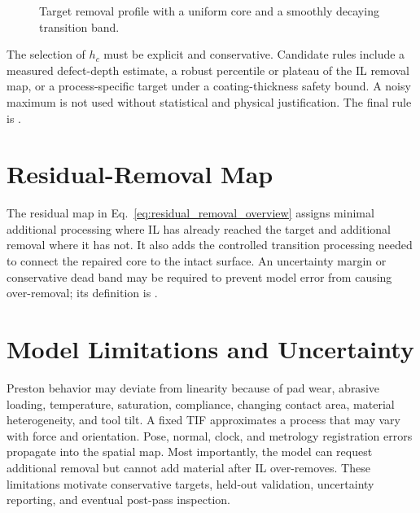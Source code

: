 \begin{figure}[t]
  \centering
  \caption{Target removal profile with a uniform core and a smoothly decaying transition band.}
  \label{fig:target_profile}
\end{figure}

The selection of \(h_c\) must be explicit and conservative. Candidate rules include a measured defect-depth estimate, a robust percentile or plateau of the IL removal map, or a process-specific target under a coating-thickness safety bound. A noisy maximum is not used without statistical and physical justification. The final rule is .

\section{Residual-Removal Map}
The residual map in Eq.~\eqref{eq:residual_removal_overview} assigns minimal additional processing where IL has already reached the target and additional removal where it has not. It also adds the controlled transition processing needed to connect the repaired core to the intact surface. An uncertainty margin or conservative dead band may be required to prevent model error from causing over-removal; its definition is .

\section{Model Limitations and Uncertainty}
Preston behavior may deviate from linearity because of pad wear, abrasive loading, temperature, saturation, compliance, changing contact area, material heterogeneity, and tool tilt. A fixed TIF approximates a process that may vary with force and orientation. Pose, normal, clock, and metrology registration errors propagate into the spatial map. Most importantly, the model can request additional removal but cannot add material after IL over-removes. These limitations motivate conservative targets, held-out validation, uncertainty reporting, and eventual post-pass inspection.
